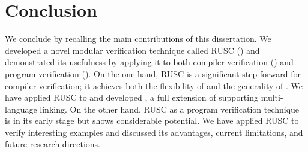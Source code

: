 \chapter{\;\;\;\;Conclusion}
\label{sec:conclusion}

We conclude by recalling the main contributions of this dissertation.
We developed a novel modular verification technique called RUSC () and demonstrated
its usefulness by applying it to both compiler verification () and program verification ().
On the one hand, RUSC is a significant step forward for compiler verification; it achieves both the flexibility of \ccx{} and the generality of \ccc{}.
We have applied RUSC to \cc{} and developed \ccm{}, a full extension of \cc{} supporting multi-language linking.
On the other hand, RUSC as a program verification technique is in its early stage but shows considerable potential.
We have applied RUSC to verify interesting examples and discussed its advantages, current limitations, and future research directions.






